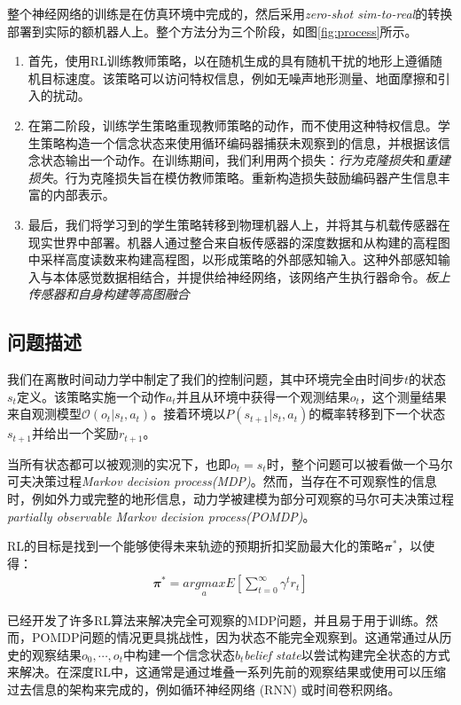 整个神经网络的训练是在仿真环境中完成的，然后采用\emph{zero-shot sim-to-real}的转换部署到实际的额机器人上。整个方法分为三个阶段，如图\ref{fig:process}所示。
\begin{enumerate}
  \item 首先，使用RL训练教师策略，以在随机生成的具有随机干扰的地形上遵循随机目标速度。该策略可以访问特权信息，例如无噪声地形测量、地面摩擦和引入的扰动。
  \item 在第二阶段，训练学生策略重现教师策略的动作，而不使用这种特权信息。学生策略构造一个信念状态来使用循环编码器捕获未观察到的信息，并根据该信念状态输出一个动作。在训练期间，我们利用两个损失：\emph{行为克隆损失}和\emph{重建损失}。行为克隆损失旨在模仿教师策略。重新构造损失鼓励编码器产生信息丰富的内部表示。
  \item 最后，我们将学习到的学生策略转移到物理机器人上，并将其与机载传感器在现实世界中部署。机器人通过整合来自板传感器的深度数据和从构建的高程图中采样高度读数来构建高程图，以形成策略的外部感知输入。这种外部感知输入与本体感觉数据相结合，并提供给神经网络，该网络产生执行器命令。\emph{板上传感器和自身构建等高图融合}
\end{enumerate}

\subsection[问题描述]{问题描述}

我们在离散时间动力学中制定了我们的控制问题，其中环境完全由时间步$t$的状态$s_t$定义。该策略实施一个动作$a_t$并且从环境中获得一个观测结果$o_t$，这个测量结果来自观测模型$\mathcal{O}(o_t|s_t,a_t)$。接着环境以$P(s_{t+1}|s_t, a_t)$的概率转移到下一个状态$s_{t+1}$并给出一个奖励$r_{t+1}$。

当所有状态都可以被观测的实况下，也即$o_t=s_t$时，整个问题可以被看做一个马尔可夫决策过程\emph{Markov decision process(MDP)}。然而，当存在不可观察性的信息时，例如外力或完整的地形信息，动力学被建模为部分可观察的马尔可夫决策过程\emph{partially observable Markov decision process(POMDP)}。

RL的目标是找到一个能够使得未来轨迹的预期折扣奖励最大化的策略$\mathbfit{\pi}^*$，以使得：
\begin{align}
  \mathbfit{\pi}^*=\underset{a}{argmax}E[\sum_{t=0}^{\infty}\gamma^t r_t]
\end{align}

已经开发了许多RL算法来解决完全可观察的MDP问题，并且易于用于训练。然而，POMDP问题的情况更具挑战性，因为状态不能完全观察到。这通常通过从历史的观察结果$o_0, \cdots, o_t$中构建一个信念状态$b_t$\emph{belief state}以尝试构建完全状态的方式来解决。在深度RL中，这通常是通过堆叠一系列先前的观察结果\cite[p]{Mnih_Kavukcuoglu_Silver_Graves_Antonoglou_Wierstra_Riedmiller_2013}或使用可以压缩过去信息的架构来完成的，例如循环神经网络 (RNN) \cite[p]{Zhu_Li_Poupart_Miao_2017}或时间卷积网络\cite[p]{Lee_Hwangbo_Wellhausen_Koltun_Hutter_2020,Bai_Kolter_Koltun_2018}。

